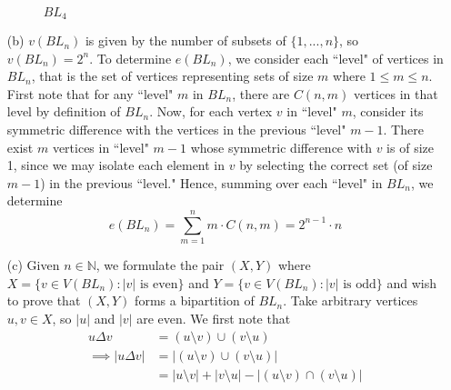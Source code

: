 \begin{ans}
\begin{itemize}
\begin{figure}[h!]
\begin{minipage}{\textwidth}
\begin{center}
{
	}
	\\
	$BL_4$
	\end{center}
	\end{minipage}
	\end{figure}
	\item[(b)] $v(BL_n)$ is given by the number of subsets of $\{1,...,n\}$, so $v(BL_n) = 2^n$. To determine $e(BL_n)$, we consider each ``level" of vertices in $BL_n$, that is the set of vertices representing sets of size $m$ where $1 \leq m \leq n$. First note that for any ``level" $m$ in $BL_n$, there are $C(n,m)$ vertices in that level by definition of $BL_n$. Now, for each vertex $v$ in ``level" $m$, consider its symmetric difference with the vertices in the previous ``level" $m-1$. There exist $m$ vertices in ``level" $m-1$ whose symmetric difference with $v$ is of size 1, since we may isolate each element in $v$ by selecting the correct set (of size $m-1$) in the previous ``level." Hence, summing over each ``level" in $BL_n$, we determine
	\begin{equation*}
		e(BL_n) = \sum_{m=1}^n {m \cdot C(n,m)} = 2^{n-1}\cdot n
	\end{equation*}
	\item[(c)] Given $n \in \mathbb{N}$, we formulate the pair $(X,Y)$ where $X = \{v \in V(BL_n): \text{$|v|$ is even}\}$ and $Y = \{v \in V(BL_n): \text{$|v|$ is odd}\}$ and wish to prove that $(X,Y)$ forms a bipartition of $BL_n$. Take arbitrary vertices $u,v \in X$, so $|u|$ and $|v|$ are even. We first note that
	\begin{align*}
		u \Delta v &= (u \setminus v) \cup (v \setminus u) \\
		\implies |u \Delta v| &= |(u \setminus v) \cup (v \setminus u)| \\
							  &= |u \setminus v| + |v \setminus u| - |(u \setminus v) \cap (v \setminus u)| \\

\end{align*}
\end{itemize}
\end{ans}
